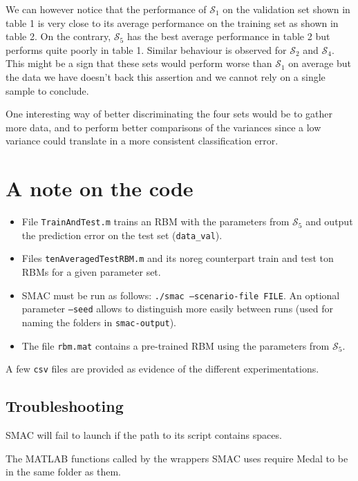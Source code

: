 \documentclass[10pt,a4paper, twocolumn]{article}
\theoremstyle{definition}
\begin{document}
We can however notice that the performance of $\mathcal{S}_1$ on the validation set shown in table 1 is very close to its average performance on the training set as shown in table 2. On the contrary, $\mathcal{S}_5$ has the best average performance in table 2 but performs quite poorly in table 1. Similar behaviour is observed for $\mathcal{S}_2$ and $\mathcal{S}_4$. This might be a sign that these sets would perform worse than $\mathcal{S}_1$ on average but the data we have doesn't back this assertion and we cannot rely on a single sample to conclude.

One interesting way of better discriminating the four sets would be to gather more data, and to perform better comparisons of the variances since a low variance could translate in a more consistent classification error.

\section{A note on the code}

\begin{itemize}
\item File \texttt{TrainAndTest.m} trains an RBM with the parameters from $\mathcal{S}_5$ and output the prediction error on the test set (\texttt{data\_val}).

\item Files \texttt{tenAveragedTestRBM.m} and its noreg counterpart train and test ton RBMs for a given parameter set.

\item SMAC must be run as follows: \texttt{./smac --scenario-file FILE}. An optional parameter \texttt{--seed} allows to distinguish more easily between runs (used for naming the folders in \texttt{smac-output}).

\item The file \texttt{rbm.mat} contains a pre-trained RBM using the parameters from $\mathcal{S}_5$.
\end{itemize}

A few \texttt{csv} files are provided as evidence of the different experimentations.

\subsection{Troubleshooting}

SMAC will fail to launch if the path to its script contains spaces.

The MATLAB functions called by the wrappers SMAC uses require Medal to be in the same folder as them.
\end{document}
